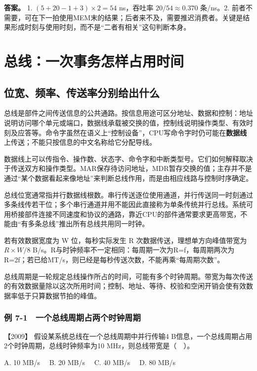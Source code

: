 \textbf{答案。} 1. \((5+20-1+3)\times2=54\) ns，吞吐率 \(20/54\approx0.370\) 条/ns。2. 前者不需要，可在下一拍使用MEM末的结果；后者来不及，需要推迟消费者。关键是结果形成时刻与使用时刻，而不是``二者有相关''这句判断本身。

\chapter{总线：一次事务怎样占用时间}\label{co-ch7}

\section{位宽、频率、传送率分别给出什么}\label{co-07-01}

总线是部件之间传送信息的公共通路。按信息用途可区分地址、数据和控制：地址说明访问哪个单元或端口，数据线承载被交换的值，控制线说明操作类型、有效时刻及应答等。命令字虽然在语义上``控制设备''，CPU写命令字时仍可能在\textbf{数据线}上传送；不能只按信息的中文名称给它分配导线。

数据线上可以传指令、操作数、状态字、命令字和中断类型号。它们如何解释取决于传送双方和操作类型。MAR保存待访问地址，MDR暂存交换的值；主存并不是通过``某个数据看起来像地址''来判断总线作用，而是由相应线路与控制时序确定。

总线位宽通常指并行数据线根数。串行传送逐位使用通道，并行传送同一时刻通过多条线传若干位；多个串行通道并用不能因此直接称为单条传统并行总线。系统可用桥接部件连接不同速度和协议的通路，靠近CPU的部件通常要求更高带宽，不能由``有多条总线''推出所有总线共用同一时钟。

若有效数据宽度为 W 位，每秒实际发生 R 次数据传送，理想单方向峰值带宽为 \(R\times W/8\) B/s。R与时钟频率不一定相同：每周期一次为R=f，每周期两次为R=2f；若已给MT/s，则已经是每秒传送次数，不能再乘``每周期次数''。

总线周期是一轮规定总线操作所占的时间，可能有多个时钟周期。带宽为每次传送的有效数据量除以这次所用时间；控制、地址、等待、校验和空闲开销会使有效数据率低于只算数据节拍的峰值。

\subsection{例 7-1　一个总线周期占两个时钟周期}\label{co-ex7-1}

\noindent{}【2009】 假设某系统总线在一个总线周期中并行传输4 B信息，一个总线周期占用2个时钟周期，总线时钟频率为10 MHz，则总线带宽是（　）。

A. 10 MB/s　 B. 20 MB/s　 C. 40 MB/s　 D. 80 MB/s

